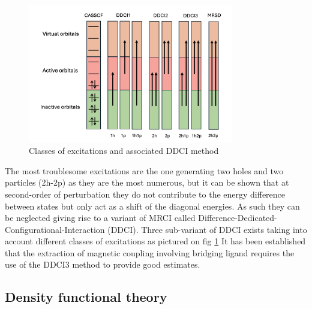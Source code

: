 \documentclass[12pt]{report}
\numberwithin{equation}{section}
\begin{document}
\begin{figure}
    \centering
    \includegraphics[width=0.8\textwidth]{Images/DDCI.png}
    \caption{Classes of excitations and associated DDCI method}
    \label{DDCI}
\end{figure}
The most troublesome excitations are the one generating two holes and two particles (2h-2p) as they are the most numerous, but it can be shown that at second-order of perturbation they do not contribute to the energy difference between states but only act as a shift of the diagonal energies.
As such they can be neglected giving rise to a variant of MRCI called Difference-Dedicated-Configurational-Interaction (DDCI). 
Three sub-variant of DDCI exists taking into account different classes of excitations as pictured on fig \ref{DDCI}
It has been established that the extraction of magnetic coupling involving bridging ligand requires the use of the DDCI3 method to provide good estimates.



\subsection{Density functional theory}
\end{document}
